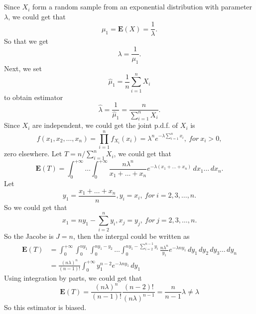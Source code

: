 \documentclass[10.5pt]{article}
\begin{document}
\section{}
Since $X_i$ form a random sample from an exponential distribution with parameter $\lambda$, we could get that $$\mu_1=\mathbf{E}(X)=\frac{1}{\lambda}.$$\indent
So that we get $$\lambda=\frac{1}{\mu_1}.$$\indent
Next, we set $$\hat{\mu}_1=\frac{1}{n}\sum_{i=1}^nX_i$$\indent
to obtain estimator $$\hat{\lambda}=\frac{1}{\hat{\mu}_1}=\frac{n}{\sum_{i=1}^nX_i}.$$\indent
Since $X_i$ are independent, we could get the joint p.d.f. of $X_i$ is $$f(x_1,x_2,\dots,x_n)=\prod_{i=1}^nf_{X_i}(x_i)=\lambda^ne^{-\lambda\sum_{i=1}^nx_i},~for ~x_i>0,$$\indent
zero elsewhere. Let $T=n/\sum_{i=1}^nX_i$, we could get that $$\mathbf{E}(T)=\int_0^{+\infty}\dots\int_{0}^{+\infty}\frac{n\lambda^n}{x_1+\dots+x_n}e^{-\lambda(x_1+\dots+x_n)}\,dx_1\dots\,dx_n.$$\indent
Let $$y_1=\frac{x_1+\dots+x_n}{n},y_i=x_i,~for ~i=2,3,\dots,n.$$\indent
So we could get that $$x_1=ny_1-\sum_{i=2}^ny_i,x_j=y_j,~for ~j=2,3,\dots,n.$$\indent
So the Jacobe is $J=n$, then the intergal could be written as $$\begin{aligned}
    \mathbf{E}(T)&=\int_0^{+\infty}\int_0^{ny_1}\int_{0}^{ny_1-y_2}\dots\int_0^{ny_1-\sum_{i=2}^{n-1}y_i}\frac{n\lambda^n}{y_1}e^{-\lambda ny_1}\,dy_1\,dy_2\,dy_3\dots\,dy_n\\
    &=\frac{(n\lambda)^n}{(n-1)!}\int_0^{+\infty}y_1^{n-2}e^{-\lambda ny_1}\,dy_1
\end{aligned}$$\indent
Using integration by parts, we could get that $$\mathbf{E}(T)=\frac{(n\lambda)^n}{(n-1)!}\frac{(n-2)!}{(n\lambda)^{n-1}}=\frac{n}{n-1}\lambda\neq\lambda$$\indent
So this estimator is biased.
\end{document}
